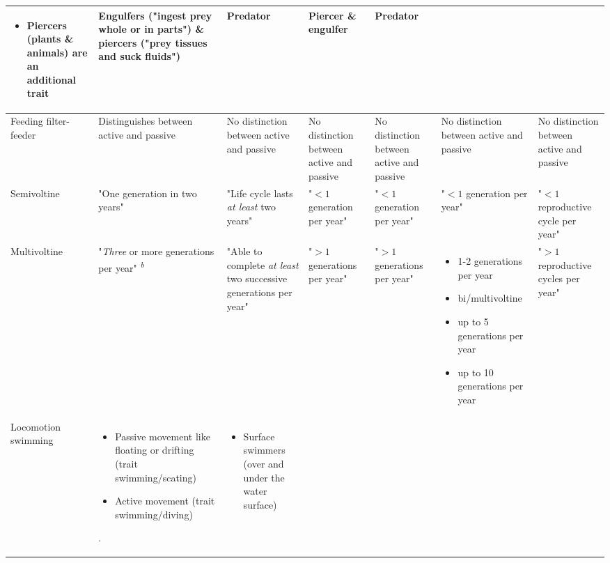 \documentclass[../Draft_harmonization_paper.tex]{subfiles}
\begin{document}
\begin{landscape}
\begin{longtable}{m{1.8cm}|m{3cm}|m{3cm}|m{3cm}|m{3cm}|m{3cm}|m{3cm}}
\begin{itemize}
            \item Piercers (plants \& animals) are an additional trait
        \end{itemize} & %
        Engulfers ("ingest prey whole or in parts") \& 
        piercers ("prey tissues and suck fluids") & 
        Predator &
        Piercer \& engulfer &
        Predator
        \\ 
        \midrule
        Feeding filter-feeder & 
        Distinguishes between active and passive &
        No distinction between active and passive &
        No distinction between active and passive &
        No distinction between active and passive &
        No distinction between active and passive &
        No distinction between active and passive
        \\
        \toprule[.1em]
        Semivoltine & 
        "One generation in two years" & 
        "Life cycle lasts \textit{at least} two years" & 
        "$< 1$ generation per year" & 
        "$< 1$ generation per year" & 
        "$< 1$ generation per year" & 
        "$< 1$ reproductive cycle per year"
        \\
        \midrule
        Multivoltine & 
        "\textit{Three} or more generations per year" \textsuperscript{\textit{b}}& 
        "Able to complete \textit{at least} two successive generations per year" &
        "$> 1$ generations per year" &
        "$> 1$ generations per year" & 
        \begin{itemize}
            \item 1-2 generations per year
            \item bi/multivoltine
            \item up to 5 generations per year
            \item up to 10 generations per year
        \end{itemize}
        & 
        "$> 1$ reproductive cycles per year"
        \\
        \toprule[.1em]
        Locomotion swimming & 
        \begin{itemize}
            \item Passive movement like floating or drifting (trait swimming/scating)
            \item Active movement (trait swimming/diving)
        \end{itemize}. &
        \begin{itemize}
            \item Surface swimmers (over and under the water surface)

\end{itemize}
\end{longtable}
\end{landscape}
\end{document}
